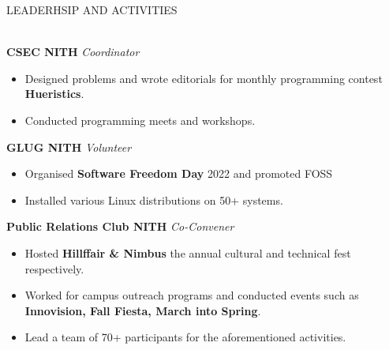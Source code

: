 \documentclass[a4paper]{article}
\newcommand{\bulletSep} { \vspace{2mm} }
\newcommand{\sectionSep} { \vspace{4mm} }
\newcommand{\lineunder} {
    \vspace*{-8pt} \\
    \hspace*{-15pt} \hrulefill \\
}
\newcommand{\header} [1] {
    {\hspace*{-18pt}\vspace*{6pt} {
        \large \scshape #1
    }}
    \vspace*{-6pt} \lineunder
    \vspace{1mm}
}
\newcommand{\activityItem}[3]{
    \textbf{#1} \hfill \textit{#2} \\
    \begin{itemize}
        #3
    \end{itemize}
}
\begin{document}


\header{LEADERHSIP AND ACTIVITIES}

\activityItem{CSEC NITH}{Coordinator}{
    \item Designed problems and wrote editorials for monthly programming contest \textbf{Hueristics}. 
    \item Conducted programming meets and workshops.
}\bulletSep

\activityItem{GLUG NITH}{Volunteer}{
    \item Organised \textbf{Software Freedom Day} 2022 and promoted FOSS 
    \item Installed various Linux distributions on 50+ systems.
}\bulletSep

\activityItem{Public Relations Club NITH}{Co-Convener}{
    \item Hosted \textbf{Hillffair \& Nimbus} the annual cultural and technical fest respectively.
    \item Worked for campus outreach programs and conducted events such as \textbf{Innovision, Fall Fiesta, March into Spring}. 
    \item Lead a team of 70+ participants for the aforementioned activities.
}
\sectionSep
\end{document}
